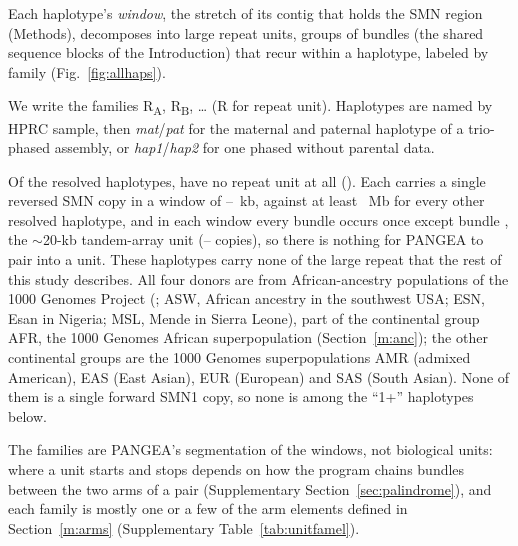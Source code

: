 \documentclass[10pt]{article}
\newcommand{\RU}[1]{R\textsubscript{#1}}%
\begin{document}
Each haplotype's \emph{window}, the stretch of its contig that holds the SMN region (Methods), decomposes into large repeat units, groups of bundles (the shared sequence blocks of the Introduction) that recur within a haplotype, labeled by family
(Fig.~\ref{fig:allhaps}).

We write the families \RU{A}, \RU{B}, \dots{} (R for repeat unit).
Haplotypes are named by HPRC sample, then \emph{mat}/\emph{pat} for the maternal and paternal haplotype of a trio-phased assembly, or \emph{hap1}/\emph{hap2} for one phased without parental data.

Of the \nHapsRes{} resolved haplotypes, \nHapsNoUnits{} have no repeat unit at all (\palNoUnitsList). Each carries a single reversed SMN copy in a window of \nouLenMin--\nouLenMax~kb, against at least \nouOtherMin~Mb for every other resolved haplotype, and in each window every bundle occurs once except bundle \nouArrBundle, the $\sim$20-kb tandem-array unit (\nouArrMin--\nouArrMax{} copies), so there is nothing for PANGEA to pair into a unit. These haplotypes carry none of the large repeat that the rest of this study describes. All four donors are from African-ancestry populations of the 1000 Genomes Project (\nouPops; ASW, African ancestry in the southwest USA; ESN, Esan in Nigeria; MSL, Mende in Sierra Leone), part of the continental group AFR, the 1000 Genomes African superpopulation (Section~\ref{m:anc}); the other continental groups are the 1000 Genomes superpopulations AMR (admixed American), EAS (East Asian), EUR (European) and SAS (South Asian). None of them is a single forward SMN1 copy, so none is among the ``1+'' haplotypes below.

The families are PANGEA's segmentation of the windows, not biological units: where a unit starts and stops depends on how the program chains bundles between the two arms of a pair (Supplementary Section~\ref{sec:palindrome}), and each family is mostly one or a few of the arm elements defined in Section~\ref{m:arms} (Supplementary Table~\ref{tab:unitfamel}).
\end{document}
